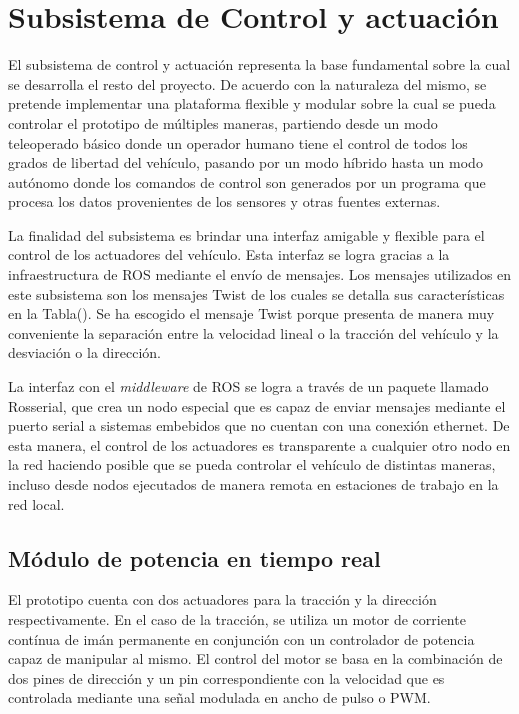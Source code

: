 \section{Subsistema de Control y actuación}

El subsistema de control y actuación representa la base fundamental sobre la cual se desarrolla el resto del proyecto. De acuerdo 
con la naturaleza del mismo, se pretende implementar una plataforma flexible y modular sobre la cual se pueda controlar el 
prototipo de múltiples maneras, partiendo desde un modo teleoperado básico donde un operador humano tiene el control 
de todos los grados de libertad del vehículo, pasando por un modo híbrido hasta un modo autónomo donde los comandos de 
control son generados por un programa que procesa los datos provenientes de los sensores y otras fuentes externas.

La finalidad del subsistema es brindar una interfaz amigable y flexible para el control de los actuadores del vehículo. Esta 
interfaz se logra gracias a la infraestructura de ROS mediante el envío de mensajes. Los mensajes utilizados en este subsistema 
son los mensajes Twist de los cuales se detalla sus características en la Tabla(). Se ha escogido el mensaje Twist porque presenta 
de manera muy conveniente la separación entre la velocidad lineal o la tracción del vehículo y la desviación o la dirección. 


La interfaz con el \textit{middleware} de ROS se logra a través de un paquete llamado Rosserial, que crea un nodo especial 
que es capaz de enviar mensajes mediante el puerto serial a sistemas embebidos que no cuentan con una conexión ethernet. De esta 
manera, el control de los actuadores es transparente a cualquier otro nodo en la red haciendo posible que se pueda controlar 
el vehículo de distintas maneras, incluso desde nodos ejecutados de manera remota en estaciones de trabajo en la red local.

    \subsection{Módulo de potencia en tiempo real}
    El prototipo cuenta con dos actuadores para la tracción y la dirección respectivamente. En el caso de la tracción, se 
    utiliza un motor de corriente contínua de imán permanente en conjunción con un controlador de potencia capaz de manipular 
    al mismo. El control del motor se basa en la combinación de dos pines de dirección y un pin correspondiente con la velocidad 
    que es controlada mediante una señal modulada en ancho de pulso o PWM. 

